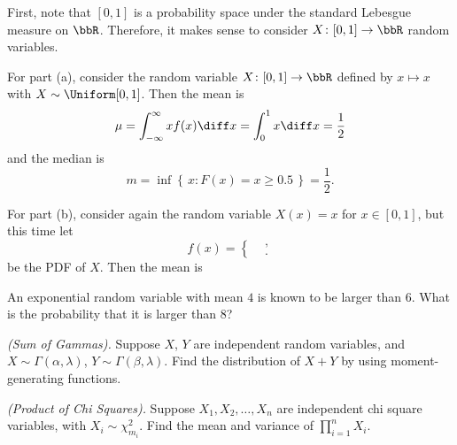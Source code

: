 \begin{solution}
  First, note that \([0,1]\) is a probability space under the standard
  Lebesgue measure on \(\bbR\). Therefore, it makes sense to consider
  \(X\colon[0,1]\to\bbR\) random variables.

  For part (a), consider the random variable \(X\colon[0,1]\to\bbR\)
  defined by \(x\mapsto x\) with \(X\sim\Uniform[0,1]\). Then the mean is
  \[
    \mu=\int_{-\infty}^\infty xf(x)\diff x=\int_0^1 x\diff x=\frac{1}{2}
  \]
  and the median is
  \[
    m=\inf\left\{\,x:F(x)=x\geq 0.5\,\right\}=\frac{1}{2}.
  \]

  For part (b), consider again the random variable \(X(x)=x\) for
  \(x\in[0,1]\), but this time let
  \[
    f(x)=
    \begin{cases}
      &\text{},\\
      &\text{}.
    \end{cases}
  \]
  be the PDF of \(X\). Then the mean is
\end{solution}
\newpage

\begin{problem}[Handout 13, \# 17]
  An exponential random variable with mean \(4\) is known to be larger than
  \(6\). What is the probability that it is larger than \(8\)?
\end{problem}
\begin{solution}

\end{solution}
\newpage

\begin{problem}[Handout 13, \# 18]
  \emph{(Sum of Gammas).} Suppose \(X\), \(Y\) are independent random
  variables, and \(X\sim \Gamma(\alpha,\lambda)\),
  \(Y\sim \Gamma(\beta,\lambda)\). Find the distribution of \(X+Y\) by
  using moment-generating functions.
\end{problem}
\begin{solution}
\end{solution}
\newpage

\begin{problem}[Handout 13, \# 19]
  \emph{(Product of Chi Squares).} Suppose \(X_1,X_2,\dotsc,X_n\) are
  independent chi square variables, with \(X_i\sim\chi_{m_i}^2\). Find the
  mean and variance of \(\prod_{i=1}^n X_i\).
\end{problem}
\begin{solution}

\end{solution}
\newpage

